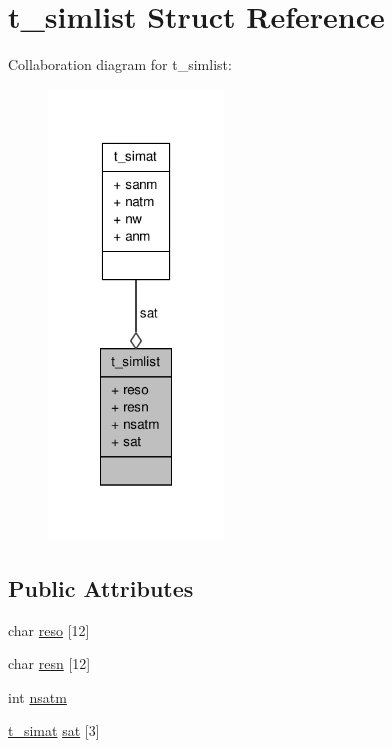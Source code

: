 \hypertarget{structt__simlist}{\section{t\-\_\-simlist \-Struct \-Reference}
\label{structt__simlist}
}


\-Collaboration diagram for t\-\_\-simlist\-:
\nopagebreak
\begin{figure}[H]
\begin{center}
\leavevmode
\includegraphics[width=132pt]{structt__simlist__coll__graph}
\end{center}
\end{figure}
\subsection*{\-Public \-Attributes}
\begin{DoxyCompactItemize}
\item 
char \hyperlink{structt__simlist_a494a6aca034f6bbfea0125d4fa70c54d}{reso} \mbox{[}12\mbox{]}
\item 
char \hyperlink{structt__simlist_a7213b062e68755c9d2b3fa555596d8e4}{resn} \mbox{[}12\mbox{]}
\item 
int \hyperlink{structt__simlist_a373bd1ed19ca0d66fa603d15548e63c7}{nsatm}
\item 
\hyperlink{structt__simat}{t\-\_\-simat} \hyperlink{structt__simlist_abc88dcc59f5cbb623057f7dea9cb7e74}{sat} \mbox{[}3\mbox{]}
\end{DoxyCompactItemize}


